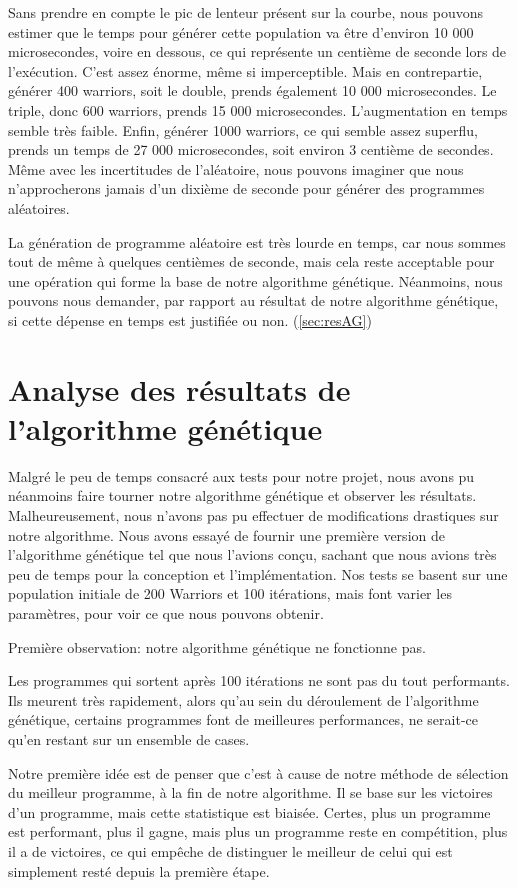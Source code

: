 \documentclass[hidelinks]{report}
\begin{document}
Sans prendre en compte le pic de lenteur présent sur la courbe, nous pouvons estimer que le temps pour générer cette population va être d'environ 10 000 microsecondes, voire en dessous, ce qui représente un centième de seconde lors de l'exécution. C'est assez énorme, même si imperceptible. Mais en contrepartie, générer 400 warriors, soit le double, prends également 10 000 microsecondes. Le triple, donc 600 warriors, prends 15 000 microsecondes. L'augmentation en temps semble très faible. Enfin, générer 1000 warriors, ce qui semble assez superflu, prends un temps de 27 000 microsecondes, soit environ 3 centième de secondes. Même avec les incertitudes de l'aléatoire, nous pouvons imaginer que nous n'approcherons jamais d'un dixième de seconde pour générer des programmes aléatoires.

La génération de programme aléatoire est très lourde en temps, car nous sommes tout de même à quelques centièmes de seconde, mais cela reste acceptable pour une opération qui forme la base de notre algorithme génétique. Néanmoins, nous pouvons nous demander, par rapport au résultat de notre algorithme génétique, si cette dépense en temps est justifiée ou non. (\autoref{sec:resAG})
\section{Analyse des résultats de l'algorithme génétique\label{sec:resAG}}
Malgré le peu de temps consacré aux tests pour notre projet, nous avons pu néanmoins faire tourner notre algorithme génétique et observer les résultats. Malheureusement, nous n'avons pas pu effectuer de modifications drastiques sur notre algorithme. Nous avons essayé de fournir une première version de l'algorithme génétique tel que nous l'avions conçu, sachant que nous avions très peu de temps pour la conception et l'implémentation. Nos tests se basent sur une population initiale de 200 Warriors et 100 itérations, mais font varier les paramètres, pour voir ce que nous pouvons obtenir.

Première observation: notre algorithme génétique ne fonctionne pas. 

Les programmes qui sortent après 100 itérations ne sont pas du tout performants. Ils meurent très rapidement, alors qu'au sein du déroulement de l'algorithme génétique, certains programmes font de meilleures performances, ne serait-ce qu'en restant sur un ensemble de cases. 

Notre première idée est de penser que c'est à cause de notre méthode de sélection du meilleur programme, à la fin de notre algorithme. Il se base sur les victoires d'un programme, mais cette statistique est biaisée. Certes, plus un programme est performant, plus il gagne, mais plus un programme reste en compétition, plus il a de victoires, ce qui empêche de distinguer le meilleur de celui qui est simplement resté depuis la première étape.
\end{document}
